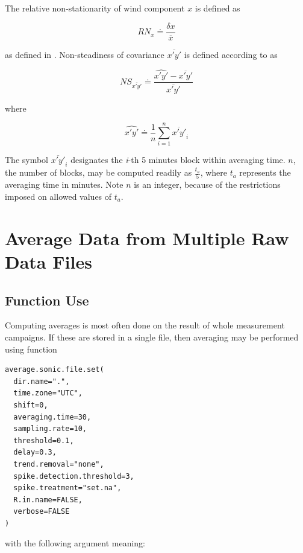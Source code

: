 \documentclass[a4paper,10pt]{book}
\begin{document}
The relative non-stationarity of wind component $x$ is defined as

\begin{equation}\label{eq:Relative Nonstationarity of X}
 RN_{x} \doteq \frac{\delta x}{\overline{x}}
\end{equation} 

\noindent as defined in \cite{Vickers1997}. Non-steadiness of covariance $\overline{x'y'}$ is defined according to \cite{Foken1996} as

\begin{equation}\label{eq:Non Steadiness of xy}
 NS_{\overline{x'y'}} \doteq \frac{\hat{x'y'} - \overline{x'y'}}{\overline{x'y'}}
\end{equation} 

\noindent where

\begin{equation}\label{eq:Partial Covariance}
 \hat{x'y'} \doteq \frac{1}{n} \sum_{i=1}^{n}\overline{x'y'}_i
\end{equation} 

The symbol $\overline{x'y'}_i$ designates the \emph{i}-th 5 minutes block within averaging time. $n$, the number of blocks, may be computed readily as $\frac{t_{a}}{5}$, where $t_{a}$ represents the averaging time in minutes. Note $n$ is an integer, because of the restrictions imposed on allowed values of $t_{a}$.


\section{Average Data from Multiple Raw Data Files}
\label{sec:Average Multiple Raw Data Files}

\subsection{Function Use}

Computing averages is most often done on the result of whole measurement campaigns. If these are stored in a single file, then averaging may be performed using function

\begin{verbatim}
average.sonic.file.set(
  dir.name=".",
  time.zone="UTC",
  shift=0,
  averaging.time=30,
  sampling.rate=10,
  threshold=0.1,
  delay=0.3,
  trend.removal="none",
  spike.detection.threshold=3,
  spike.treatment="set.na",
  R.in.name=FALSE,
  verbose=FALSE
)
\end{verbatim} 

\noindent with the following argument meaning:
\end{document}
